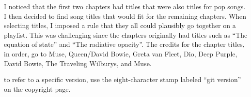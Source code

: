  I noticed that the first two chapters had titles that were also titles for pop songs. I then decided to find song titles that would fit for the remaining chapters. When selecting titles, I imposed a rule that they all could plausibly go together on a playlist. This was challenging since the chapters originally had titles such as ``The equation of state'' and ``The radiative opacity''. The credits for the chapter titles, in order, go to Muse, Queen/David Bowie, Greta van Fleet, Dio, Deep Purple, David Bowie, The Traveling Wilburys, and Muse.

 to refer to a specific version, use the eight-character stamp labeled ``git version'' on the copyright page.
